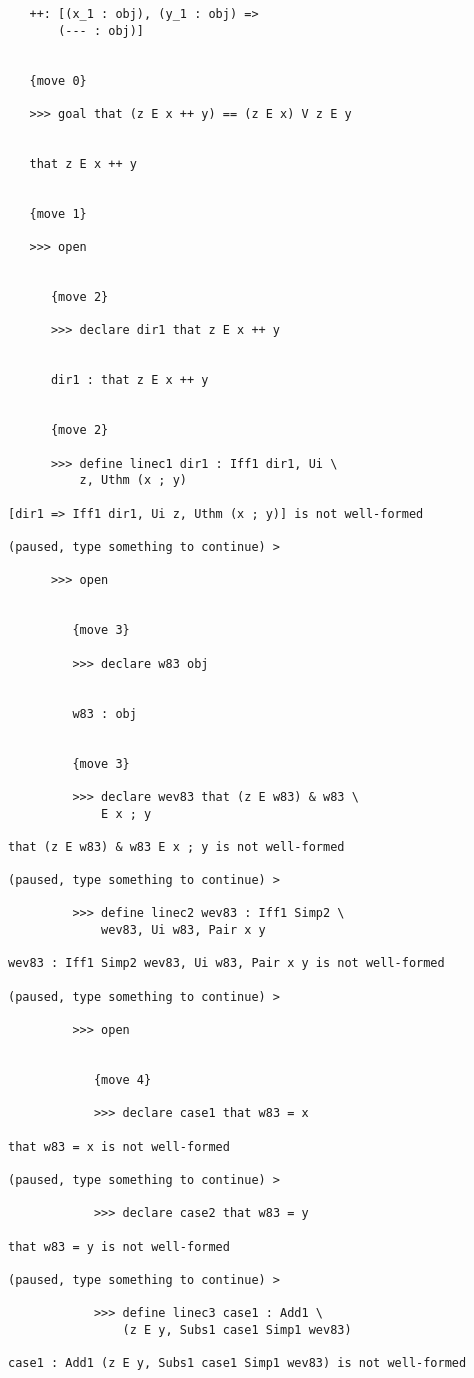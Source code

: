 \documentclass[12pt]{article}
\begin{document}
\begin{verbatim}
   ++: [(x_1 : obj), (y_1 : obj) => 
       (--- : obj)]


   {move 0}

   >>> goal that (z E x ++ y) == (z E x) V z E y


   that z E x ++ y


   {move 1}

   >>> open


      {move 2}

      >>> declare dir1 that z E x ++ y


      dir1 : that z E x ++ y


      {move 2}

      >>> define linec1 dir1 : Iff1 dir1, Ui \
          z, Uthm (x ; y)

[dir1 => Iff1 dir1, Ui z, Uthm (x ; y)] is not well-formed

(paused, type something to continue) >

      >>> open


         {move 3}

         >>> declare w83 obj


         w83 : obj


         {move 3}

         >>> declare wev83 that (z E w83) & w83 \
             E x ; y

that (z E w83) & w83 E x ; y is not well-formed

(paused, type something to continue) >

         >>> define linec2 wev83 : Iff1 Simp2 \
             wev83, Ui w83, Pair x y

wev83 : Iff1 Simp2 wev83, Ui w83, Pair x y is not well-formed

(paused, type something to continue) >

         >>> open


            {move 4}

            >>> declare case1 that w83 = x

that w83 = x is not well-formed

(paused, type something to continue) >

            >>> declare case2 that w83 = y

that w83 = y is not well-formed

(paused, type something to continue) >

            >>> define linec3 case1 : Add1 \
                (z E y, Subs1 case1 Simp1 wev83)

case1 : Add1 (z E y, Subs1 case1 Simp1 wev83) is not well-formed


\end{verbatim}
\end{document}
